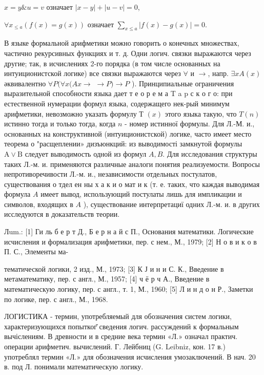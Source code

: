 \documentclass[10pt]{article}
\begin{document}
$x=y \& u=v$ означает $|x-y|+|u-v|=0$,



$\forall x_{\leqslant a}(f(x)=g(x))$ означает $\sum_{x \leqslant a}|f(x)-g(x)|=0$.



В языке формальной арифметики можно говорить о конечных множествах, частично рекурсивных функциях и т. д. Одни логич. связки выражаются через другие; так, в исчислениях 2-го порядка (в том числе основанных на интуиционистской логике) все связки выражаются через $\forall$ и $\rightarrow$, напр. $\exists x A(x)$ әквивалентно $\forall P(\forall x(A x \rightarrow$ $\rightarrow P) \rightarrow P$ ). Принципиальные ограничения выразительной способности языка дает т е о р е м а T a p с к о г о: при естественной нумерации формул языка, содержащего нек-рый минимум арифметики, невозможно указать формулу Т $(x)$ этого языка такую, что $T(n)$ истинно тогда и только тогда, когда $n$ - номер истинної формулы. Для Л.-М. и., основанных на конструктивной (интуиционистской) логике, часто имеет место теорема о "расщеплении» дизъюнкций: из выводимості замкнутой формулы $\mathrm{A} \vee \mathrm{B}$ следует выводимость одной из формул $A, B$. Для исследования структуры таких Л.-м. и. применяются различные аналоги понятия реализуемости. Вопросы непротиворечивости Л.-м. и., независимости отдельных постулатов, существования о тдел ен ны х а к и о мат и к (т. е. таких, что каждая выводимая формула $A$ имеет вывод, использующий постулаты лишь для импликации и символов, входящих в $A$ ), существование интерпретациї одних Л.-м. и. в других исследуются в доказательств теории.



Лum.: [1] Ги ль б е р т Д., Б е р н а й с П., Основания математики. Логические исчисления и формализация арифметики, пер. с нем., М., 1979; [2] Н о в и к о в П. С., Элементы ма-

тематической логики, 2 изд., М., 1973; [3] К Ј и н и С. К., Введение в метаматематику, пер. с англ., М., 1957; [4] ч ё р ч А., Введение в математическую логику, пер. с англ., т. 1, М., 1960; [5] Л и н д о н Р., Заметки по логике, пер. с англ., М., 1968.



ЛОГИСТИКА - термин, употребляемый для обозначения систем логики, характеризующихся попытког̆ сведения логич. рассуждений к формальным вычіслениям. В древности и в средние века термин «Л.» означал практич. операции арифметич. вычислений. Г. Лейбниц (G. Leibniz, кон. 17 в.) употреблял термин «Л.» для обозначения исчисления умозаключений. В нач. 20 в. под Л. понимали математическую логику.
\end{document}
